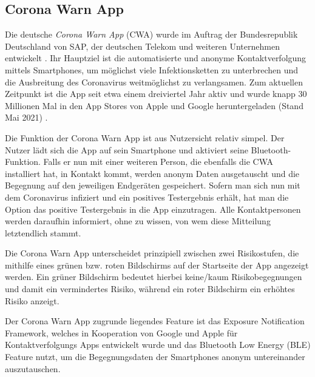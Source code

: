 \documentclass[conference,compsoc]{IEEEtran}
\begin{document}
\subsection{Corona Warn App}
Die deutsche \textit{Corona Warn App} (CWA) wurde im Auftrag der Bundesrepublik Deutschland von SAP, der deutschen Telekom und weiteren Unternehmen entwickelt \cite{CWA}. 
Ihr Hauptziel ist die automatisierte und anonyme Kontaktverfolgung mittels Smartphones, um möglichst viele Infektionsketten zu unterbrechen und die Ausbreitung des Coronavirus weitmöglichst zu verlangsamen. 
Zum aktuellen Zeitpunkt ist die App seit etwa einem dreiviertel Jahr aktiv und wurde knapp 30 Millionen Mal in den App Stores von Apple und Google heruntergeladen (Stand Mai 2021) \cite{Downloads}.

Die Funktion der Corona Warn App ist aus Nutzersicht relativ simpel. Der Nutzer lädt sich die App auf sein Smartphone und aktiviert seine Bluetooth-Funktion. 
Falls er nun mit einer weiteren Person, die ebenfalls die CWA installiert hat, in Kontakt kommt, werden anonym Daten ausgetauscht und die Begegnung auf den jeweiligen Endgeräten gespeichert. 
Sofern man sich nun mit dem Coronavirus infiziert und ein positives Testergebnis erhält, hat man die Option das positive Testergebnis in die App einzutragen. 
Alle Kontaktpersonen werden daraufhin informiert, ohne zu wissen, von wem diese Mitteilung letztendlich stammt. 

Die Corona Warn App unterscheidet prinzipiell zwischen zwei Risikostufen, die mithilfe eines grünen bzw. roten Bildschirms auf der Startseite der App angezeigt werden. 
Ein grüner Bildschirm bedeutet hierbei keine/kaum Risikobegegnungen und damit ein vermindertes Risiko, während ein roter Bildschirm ein erhöhtes Risiko anzeigt.

Der Corona Warn App zugrunde liegendes Feature ist das \glqq Exposure Notification Framework\grqq, 
welches in Kooperation von Google und Apple für Kontaktverfolgungs Apps entwickelt wurde und das Bluetooth Low Energy (BLE) Feature nutzt, 
um die Begegnungsdaten der Smartphones anonym untereinander auszutauschen. \\
\end{document}
